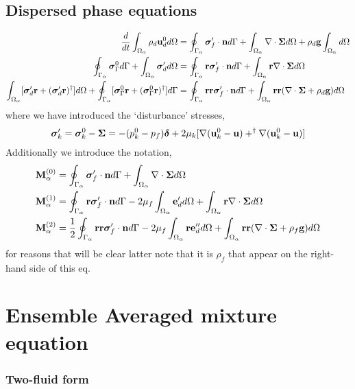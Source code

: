 \documentclass[12pt]{My_preprint}
\begin{document}
\subsection{Dispersed phase equations}
\begin{align}
    \frac{d}{dt} \int_{\Omega_{\alpha}} \rho_d\textbf{u}_d^0 d\Omega
    &= 
    \oint_{\Gamma_{\alpha}} \bm{\sigma}_f' \cdot \textbf{n} d\Gamma
    + \int_{\Omega_{\alpha}} \mathbf{\nabla}\cdot\bm\Sigma d\Omega
    + \rho_d \textbf{g}\int_{\Omega_{\alpha}}  d\Omega\\
    \oint_{\Gamma_{\alpha}}  \bm{\sigma}_\Gamma^0 d\Gamma
    +\int_{\Omega_{\alpha}}  \bm{\sigma}_d' d\Omega
    &= 
    \oint_{\Gamma_{\alpha}} \textbf{r} \bm{\sigma}_f' \cdot \textbf{n} d\Gamma
    + \int_{\Omega_{\alpha}} \textbf{r} \mathbf{\nabla}\cdot\bm\Sigma d\Omega\\
    \int_{\Omega_{\alpha}} [\bm\sigma_d' \textbf{r} + (\bm\sigma_d' \textbf{r})^\dagger] d\Omega
    + \oint_{\Gamma_{\alpha}} [\bm\sigma_\Gamma^0 \textbf{r} + (\bm\sigma_\Gamma^0 \textbf{r})^\dagger] d\Gamma
    &= 
    \oint_{\Gamma_{\alpha}} \textbf{rr}\bm{\sigma}_f'\cdot\textbf{n} d\Gamma
    + \int_{\Omega_{\alpha}} \textbf{rr}(\mathbf{\nabla}\cdot\bm\Sigma + \rho_d \textbf{g}) d\Omega 
\end{align}
where we have introduced the `disturbance' stresses, 
\begin{equation}
    \bm{\sigma}_k'
    =
    \bm{\sigma}_k^0
    -
    \bm{\Sigma}
    =
    - (p_k^0 - p_f) \bm\delta
    + 2\mu_k [
        \mathbf{\nabla}(\textbf{u}_k^0 - \textbf{u})
        + ^\dagger\mathbf{\nabla}(\textbf{u}_k^0 - \textbf{u})
    ]
\end{equation}
Additionally we introduce the notation, 
\begin{align}
    \textbf{M}_\alpha^{(0)} &=
    \oint_{\Gamma_{\alpha}} \bm{\sigma}_f' \cdot \textbf{n} d\Gamma
   +\int_{\Omega_{\alpha}} \mathbf{\nabla}\cdot \bm\Sigma d\Omega
   \\
   \textbf{M}_\alpha^{(1)} &=
   \oint_{\Gamma_{\alpha}} \textbf{r}\bm{\sigma}_f' \cdot \textbf{n} d\Gamma
   -2\mu_f \int_{\Omega_{\alpha}} \textbf{e}_d' d\Omega
   +\int_{\Omega_{\alpha}} \textbf{r}\mathbf{\nabla}\cdot \bm\Sigma d\Omega
   \\
   \textbf{M}_\alpha^{(2)} &=
   \frac{1}{2}\oint_{\Gamma_{\alpha}} \textbf{rr}\bm{\sigma}_f' \cdot \textbf{n} d\Gamma
   -2\mu_f \int_{\Omega_{\alpha}} \textbf{re}_d'' d\Omega
   +\int_{\Omega_{\alpha}} \textbf{rr}(\mathbf{\nabla}\cdot \bm\Sigma+ \rho_f\textbf{g}) d\Omega
    \\
\end{align}
for reasons that will be clear latter note that it is $\rho_f$ that appear on the right-hand side of this eq. 

\section{Ensemble Averaged mixture equation}
\subsubsection{Two-fluid form}
\end{document}
